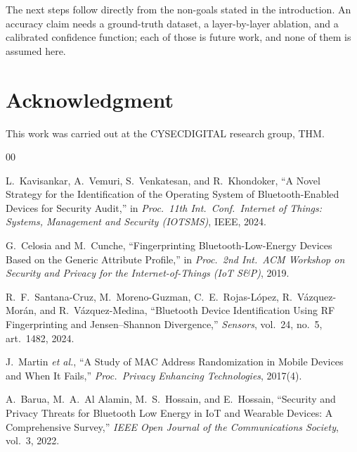 \documentclass[conference]{IEEEtran}
\begin{document}
The next steps follow directly from the non-goals stated in the introduction.
An accuracy claim needs a ground-truth dataset, a layer-by-layer ablation, and
a calibrated confidence function; each of those is future work, and none of
them is assumed here.

\section*{Acknowledgment}
This work was carried out at the CYSECDIGITAL research group, THM.

\begin{thebibliography}{00}

L.~Kavisankar, A.~Vemuri, S.~Venkatesan, and R.~Khondoker,
``A Novel Strategy for the Identification of the Operating System of
Bluetooth-Enabled Devices for Security Audit,''
in \emph{Proc.\ 11th Int.\ Conf.\ Internet of Things: Systems,
Management and Security (IOTSMS)}, IEEE, 2024.

G.~Celosia and M.~Cunche,
``Fingerprinting Bluetooth-Low-Energy Devices Based on the Generic
Attribute Profile,''
in \emph{Proc.\ 2nd Int.\ ACM Workshop on Security and Privacy for the
Internet-of-Things (IoT S\&P)}, 2019.

R.~F.~Santana-Cruz, M.~Moreno-Guzman, C.~E.~Rojas-L\'opez,
R.~V\'azquez-Mor\'an, and R.~V\'azquez-Medina,
``Bluetooth Device Identification Using RF Fingerprinting and
Jensen--Shannon Divergence,''
\emph{Sensors}, vol.~24, no.~5, art.~1482, 2024.

J.~Martin \emph{et al.},
``A Study of MAC Address Randomization in Mobile Devices and When It
Fails,''
\emph{Proc.\ Privacy Enhancing Technologies}, 2017(4).

A.~Barua, M.~A.~Al Alamin, M.~S.~Hossain, and E.~Hossain,
``Security and Privacy Threats for Bluetooth Low Energy in IoT and
Wearable Devices: A Comprehensive Survey,''
\emph{IEEE Open Journal of the Communications Society}, vol.~3, 2022.

\end{thebibliography}
\end{document}
